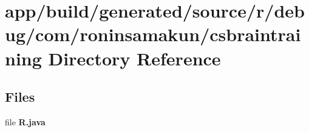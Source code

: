 \section{app/build/generated/source/r/debug/com/roninsamakun/csbraintraining Directory Reference}
\label{dir_451734af15b0025b3585184bae33265f}
\subsection*{Files}
\begin{DoxyCompactItemize}
\item 
file {\bfseries R.\+java}
\end{DoxyCompactItemize}
